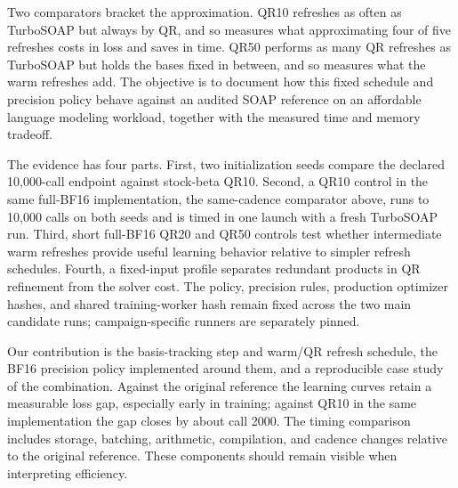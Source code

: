 Two comparators bracket the approximation. QR10 refreshes as often as
TurboSOAP but always by QR, and so measures what approximating four
of five refreshes costs in loss and saves in time. QR50 performs as many
QR refreshes as TurboSOAP but holds the bases fixed in between, and so
measures what the warm refreshes add. The objective is to document how
this fixed schedule and precision policy behave against an audited SOAP
reference on an affordable language modeling workload, together with
the measured time and memory tradeoff.

The evidence has four parts. First, two initialization seeds compare
the declared 10,000-call endpoint against stock-beta QR10. Second, a
QR10 control in the same full-BF16 implementation, the same-cadence
comparator above, runs to 10,000 calls on both seeds and is timed in
one launch with a fresh TurboSOAP run. Third, short full-BF16 QR20 and
QR50 controls test whether intermediate warm refreshes provide useful
learning behavior relative to simpler refresh schedules. Fourth, a
fixed-input profile separates redundant products in QR refinement from
the solver cost. The policy, precision rules, production
optimizer hashes, and shared training-worker hash remain fixed across
the two main candidate runs; campaign-specific runners are separately
pinned.

Our contribution is the basis-tracking step and warm/QR refresh
schedule, the BF16 precision policy implemented around them, and a
reproducible case study of the combination. Against the original
reference the learning curves retain a measurable loss gap, especially
early in training; against QR10 in the same implementation the gap
closes by about call 2000. The timing
comparison includes storage, batching, arithmetic, compilation, and
cadence changes relative to the original reference. These components
should remain visible when interpreting efficiency.
